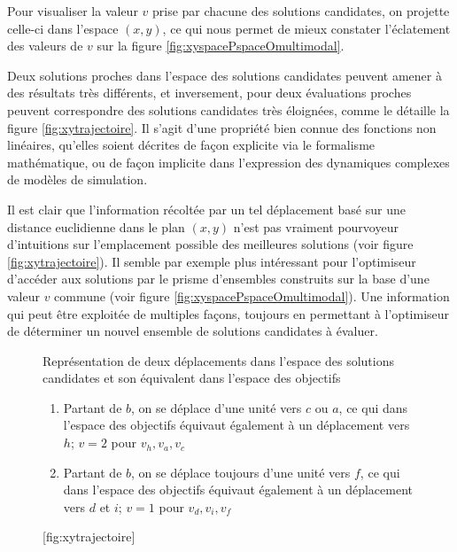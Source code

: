 Pour visualiser la valeur $v$ prise par chacune des solutions candidates, on projette celle-ci dans l'espace $(x,y)$, ce qui nous permet de mieux constater l'éclatement des valeurs de $v$ sur la figure \ref{fig:xyspacePspaceOmultimodal}.

Deux solutions proches dans l'espace des solutions candidates peuvent amener à des résultats très différents, et inversement, pour deux évaluations proches peuvent correspondre des solutions candidates très éloignées, comme le détaille la figure \ref{fig:xytrajectoire}. Il s'agit d'une propriété bien connue des fonctions non linéaires, qu'elles soient décrites de façon explicite via le formalisme mathématique, ou de façon implicite dans l'expression des dynamiques complexes de modèles de simulation.

Il est clair que l'information récoltée par un tel déplacement basé sur une distance euclidienne dans le plan $(x,y)$ n'est pas vraiment pourvoyeur d'intuitions sur l'emplacement possible des meilleures solutions (voir figure \ref{fig:xytrajectoire}). Il semble par exemple plus intéressant pour l'optimiseur d'accéder aux solutions par le prisme d'ensembles construits sur la base d'une valeur $v$ commune (voir figure \ref{fig:xyspacePspaceOmultimodal}). Une information qui peut être exploitée de multiples façons, toujours en permettant à l'optimiseur de déterminer un nouvel ensemble de solutions candidates à évaluer.

\begin{figure}[!htbp]
	\begin{sidecaption}[fortoc]{Représentation de deux déplacements dans l'espace des solutions candidates et son équivalent dans l'espace des objectifs
	\parbox{\marginparwidth}{
	\begin{enumerate}[label=(\alph*),labelindent=\parindent,leftmargin=*]
	        \item Partant de $b$, on se déplace d'une unité vers $c$ ou $a$, ce qui dans l'espace des objectifs équivaut également à un déplacement vers $h$; $v=2$ pour $v_h, v_a, v_c$
	        \item Partant de $b$, on se déplace toujours d'une unité vers $f$, ce qui dans l'espace des objectifs équivaut également à un déplacement vers $d$ et $i$; $v=1$ pour $v_d,v_i,v_f$
	\end{enumerate}}}[fig:xytrajectoire]
	 \centering
	  \qquad
	\end{sidecaption}
\end{figure}

